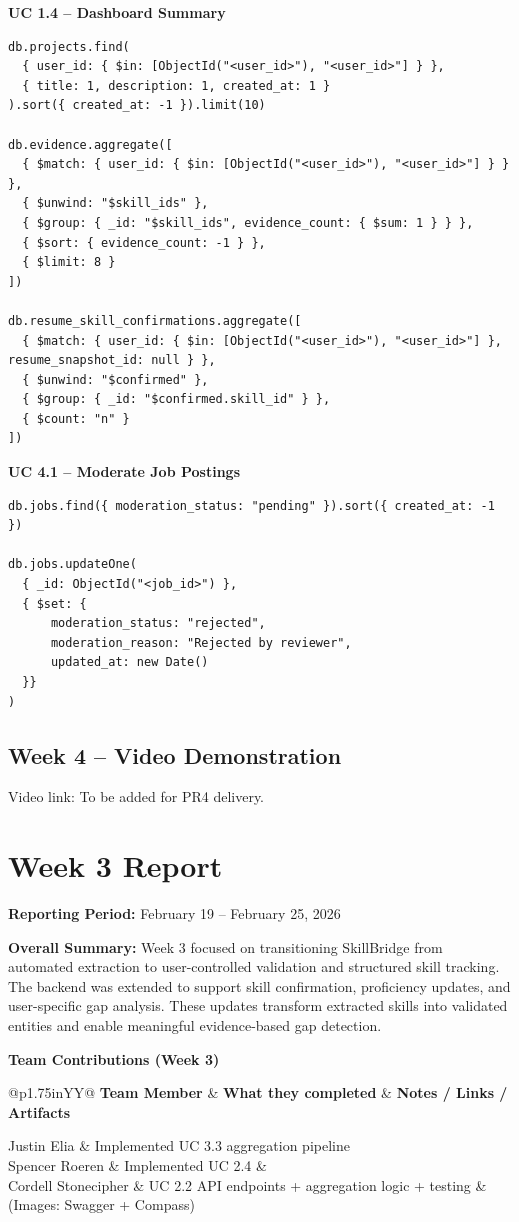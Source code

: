 \documentclass[11pt]{article}
\makeatletter
\newcommand{\WeekReport}[4]{
  \clearpage
  \section*{Week #1 Report}
  \addcontentsline{toc}{section}{Week #1 Report}
  \vspace{-0.25em}
  \noindent\textbf{Reporting Period:} #2

  \vspace{0.5em}
  \noindent\textbf{Overall Summary:} #3

  \vspace{0.75em}
  \noindent\textbf{Team Contributions (Week #1)}
  \vspace{0.25em}

  \begin{table}[H]
    \renewcommand{\arraystretch}{1.2}
    \begin{tabularx}{\linewidth}{@{}p{1.75in}YY@{}}
      \toprule
      \textbf{Team Member} & \textbf{What they completed} & \textbf{Notes / Links / Artifacts} \\
      \midrule
      #4
      \bottomrule
    \end{tabularx}
  \end{table}
}
\makeatother
\begin{document}
\noindent
\textbf{UC 1.4 -- Dashboard Summary}
\begin{verbatim}
db.projects.find(
  { user_id: { $in: [ObjectId("<user_id>"), "<user_id>"] } },
  { title: 1, description: 1, created_at: 1 }
).sort({ created_at: -1 }).limit(10)

db.evidence.aggregate([
  { $match: { user_id: { $in: [ObjectId("<user_id>"), "<user_id>"] } } },
  { $unwind: "$skill_ids" },
  { $group: { _id: "$skill_ids", evidence_count: { $sum: 1 } } },
  { $sort: { evidence_count: -1 } },
  { $limit: 8 }
])

db.resume_skill_confirmations.aggregate([
  { $match: { user_id: { $in: [ObjectId("<user_id>"), "<user_id>"] }, resume_snapshot_id: null } },
  { $unwind: "$confirmed" },
  { $group: { _id: "$confirmed.skill_id" } },
  { $count: "n" }
])
\end{verbatim}

\noindent
\textbf{UC 4.1 -- Moderate Job Postings}
\begin{verbatim}
db.jobs.find({ moderation_status: "pending" }).sort({ created_at: -1 })

db.jobs.updateOne(
  { _id: ObjectId("<job_id>") },
  { $set: {
      moderation_status: "rejected",
      moderation_reason: "Rejected by reviewer",
      updated_at: new Date()
  }}
)
\end{verbatim}

\subsection*{Week 4 -- Video Demonstration}
\noindent
Video link: To be added for PR4 delivery.

\WeekReport{3}{February 19 -- February 25, 2026}{
Week 3 focused on transitioning SkillBridge from automated extraction to user-controlled validation and structured skill tracking. The backend was extended to support skill confirmation, proficiency updates, and user-specific gap analysis. These updates transform extracted skills into validated entities and enable meaningful evidence-based gap detection.
}{
Justin Elia & Implemented UC 3.3 aggregation pipeline  \\
Spencer Roeren & Implemented UC 2.4 &  \\
Cordell Stonecipher & UC 2.2 API endpoints + aggregation logic + testing & (Images: Swagger + Compass) \\
}
\end{document}
